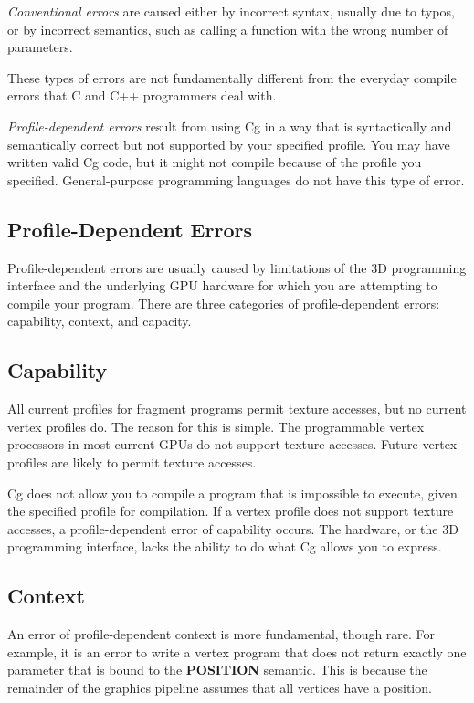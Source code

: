 \documentclass[../main.tex]{subfiles}
\begin{document}
\textit{Conventional errors} are caused either by incorrect syntax, usually due to typos, or by incorrect semantics, such as calling a function with the wrong number of parameters.

These types of errors are not fundamentally different from the everyday compile errors that C and C++ programmers deal with.

\textit{Profile-dependent errors} result from using Cg in a way that is syntactically and semantically correct but not supported by your specified profile. You may have written valid Cg code, but it might not compile because of the profile you specified. General-purpose programming languages do not have this type of error.

\subsection{Profile-Dependent Errors}

Profile-dependent errors are usually caused by limitations of the 3D programming interface and the underlying GPU hardware for which you are attempting to compile your program. There are three categories of profile-dependent errors: capability, context, and capacity.

\subsection*{Capability}

All current profiles for fragment programs permit texture accesses, but no current vertex profiles do. The reason for this is simple. The programmable vertex processors in most current GPUs do not support texture accesses. Future vertex profiles are likely to permit texture accesses.

Cg does not allow you to compile a program that is impossible to execute, given the specified profile for compilation. If a vertex profile does not support texture accesses, a profile-dependent error of capability occurs. The hardware, or the 3D programming interface, lacks the ability to do what Cg allows you to express.

\subsection*{Context}

An error of profile-dependent context is more fundamental, though rare. For example, it is an error to write a vertex program that does not return exactly one parameter that is bound to the \textbf{POSITION} semantic. This is because the remainder of the graphics pipeline assumes that all vertices have a position.
\end{document}
